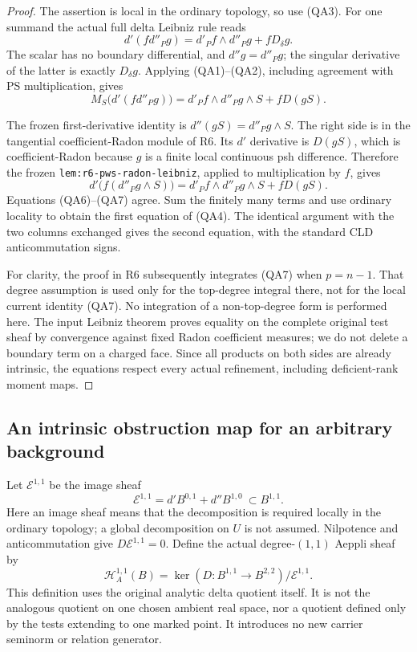 \begin{proof}
The assertion is local in the ordinary topology, so use (QA3).
For one summand the actual full delta Leibniz rule reads
\[
 d'(f d''_P g)=d'_P f\wedge d''_P g+fD_\delta g.
                                                        \tag{QA5}
\]
The scalar has no boundary differential, and $d''g=d''_Pg$;
the singular derivative of the latter is exactly $D_\delta g$.
Applying (QA1)--(QA2), including agreement with PS multiplication,
gives
\[
 M_S\bigl(d'(f d''_P g)\bigr)
       =d'_P f\wedge d''_P g\wedge S+fD(gS).             \tag{QA6}
\]

The frozen first-derivative identity is
$d''(gS)=d''_Pg\wedge S$.  The right side is in the tangential
coefficient-Radon module of R6.  Its $d'$ derivative is $D(gS)$,
which is coefficient-Radon because $g$ is a finite local continuous
psh difference.  Therefore the frozen
\texttt{lem:r6-pws-radon-leibniz}, applied to multiplication by
$f$, gives
\[
 d'\bigl(f(d''_P g\wedge S)\bigr)
       =d'_P f\wedge d''_P g\wedge S+fD(gS).             \tag{QA7}
\]
Equations (QA6)--(QA7) agree.  Sum the finitely many terms and
use ordinary locality to obtain the first equation of (QA4).
The identical argument with the two columns exchanged gives the
second equation, with the standard CLD anticommutation signs.

For clarity, the proof in R6 subsequently integrates (QA7) when
$p=n-1$.  That degree assumption is used only for the top-degree
integral there, not for the local current identity (QA7).  No
integration of a non-top-degree form is performed here.
The input Leibniz theorem proves equality on the complete original
test sheaf by convergence against fixed Radon coefficient measures;
we do not delete a boundary term on a charged face.  Since all
products on both sides are already intrinsic, the equations respect
every actual refinement, including deficient-rank moment maps.
\end{proof}

\subsection{An intrinsic obstruction map for an arbitrary background}

Let $\mathcal E^{1,1}$ be the image sheaf
\[
 \mathcal E^{1,1}
   =d'B^{0,1}+d''B^{1,0}\ \subset B^{1,1}.               \tag{QA8}
\]
Here an image sheaf means that the decomposition is required locally
in the ordinary topology; a global decomposition on $U$ is not
assumed.  Nilpotence and anticommutation give $D\mathcal E^{1,1}=0$.
Define the actual degree-$(1,1)$ Aeppli sheaf by
\[
 \mathcal H_A^{1,1}(B)
   =\ker(D:B^{1,1}\to B^{2,2})/\mathcal E^{1,1}.          \tag{QA9}
\]
This definition uses the original analytic delta quotient itself.
It is not the analogous quotient on one chosen ambient real space,
nor a quotient defined only by the tests extending to one marked
point.  It introduces no new carrier seminorm or relation generator.

